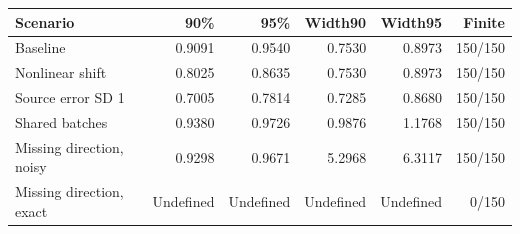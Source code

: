 \begin{tabular}{lrrrrr}
\toprule
Scenario & 90\% & 95\% & Width90 & Width95 & Finite \\
\midrule
Baseline & 0.9091 & 0.9540 & 0.7530 & 0.8973 & 150/150 \\
Nonlinear shift & 0.8025 & 0.8635 & 0.7530 & 0.8973 & 150/150 \\
Source error SD 1 & 0.7005 & 0.7814 & 0.7285 & 0.8680 & 150/150 \\
Shared batches & 0.9380 & 0.9726 & 0.9876 & 1.1768 & 150/150 \\
Missing direction, noisy & 0.9298 & 0.9671 & 5.2968 & 6.3117 & 150/150 \\
Missing direction, exact & Undefined & Undefined & Undefined & Undefined & 0/150 \\
\bottomrule
\end{tabular}
